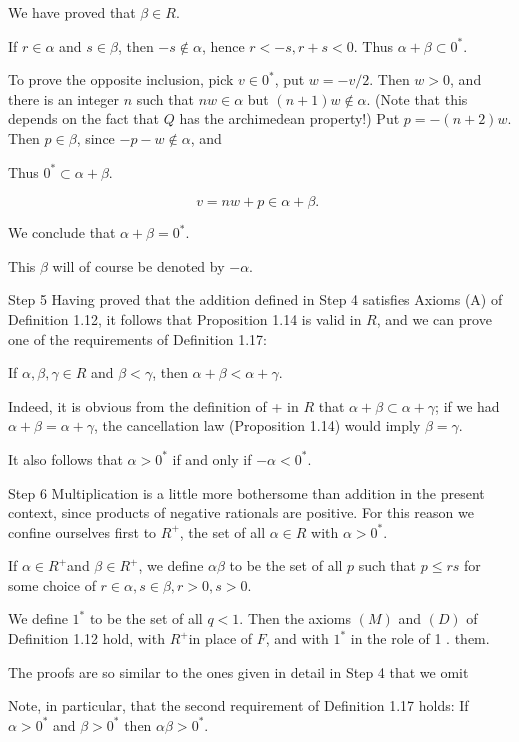 \documentclass[10pt]{article}
\begin{document}
We have proved that $\beta \in R$.

If $r \in \alpha$ and $s \in \beta$, then $-s \notin \alpha$, hence $r<-s, r+s<0$. Thus $\alpha+\beta \subset 0^{*}$.

To prove the opposite inclusion, pick $v \in 0^{*}$, put $w=-v / 2$. Then $w>0$, and there is an integer $n$ such that $n w \in \alpha$ but $(n+1) w \notin \alpha$. (Note that this depends on the fact that $Q$ has the archimedean property!) Put $p=-(n+2) w$. Then $p \in \beta$, since $-p-w \notin \alpha$, and

Thus $0^{*} \subset \alpha+\beta$.

$$
v=n w+p \in \alpha+\beta \text {. }
$$

We conclude that $\alpha+\beta=0^{*}$.

This $\beta$ will of course be denoted by $-\alpha$.

Step 5 Having proved that the addition defined in Step 4 satisfies Axioms (A) of Definition 1.12, it follows that Proposition 1.14 is valid in $R$, and we can prove one of the requirements of Definition 1.17:

If $\alpha, \beta, \gamma \in R$ and $\beta<\gamma$, then $\alpha+\beta<\alpha+\gamma$.

Indeed, it is obvious from the definition of + in $R$ that $\alpha+\beta \subset \alpha+\gamma$; if we had $\alpha+\beta=\alpha+\gamma$, the cancellation law (Proposition 1.14) would imply $\beta=\gamma$.

It also follows that $\alpha>0^{*}$ if and only if $-\alpha<0^{*}$.

Step 6 Multiplication is a little more bothersome than addition in the present context, since products of negative rationals are positive. For this reason we confine ourselves first to $R^{+}$, the set of all $\alpha \in R$ with $\alpha>0^{*}$.

If $\alpha \in R^{+}$and $\beta \in R^{+}$, we define $\alpha \beta$ to be the set of all $p$ such that $p \leq r s$ for some choice of $r \in \alpha, s \in \beta, r>0, s>0$.

We define $1^{*}$ to be the set of all $q<1$. Then the axioms $(M)$ and $(D)$ of Definition 1.12 hold, with $R^{+}$in place of $F$, and with $1^{*}$ in the role of 1 . them.

The proofs are so similar to the ones given in detail in Step 4 that we omit

Note, in particular, that the second requirement of Definition 1.17 holds: If $\alpha>0^{*}$ and $\beta>0^{*}$ then $\alpha \beta>0^{*}$.
\end{document}

